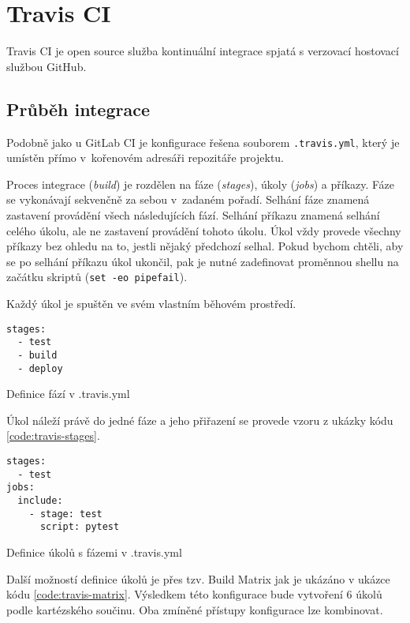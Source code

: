 \chapter{Travis CI}

Travis CI je open source služba kontinuální integrace spjatá s verzovací hostovací službou GitHub.

\section{Průběh integrace}

Podobně jako u GitLab CI je konfigurace řešena souborem \verb|.travis.yml|, který je umístěn přímo v~kořenovém adresáři repozitáře projektu.

Proces integrace (\textit{build}) je rozdělen na fáze (\textit{stages}), úkoly (\textit{jobs}) a příkazy.
Fáze se vykonávají sekvenčně za sebou v~zadaném pořadí.
Selhání fáze znamená zastavení provádění všech následujících fází.
Selhání příkazu znamená selhání celého úkolu, ale ne zastavení provádění tohoto úkolu.
Úkol vždy provede všechny příkazy bez ohledu na to, jestli nějaký předchozí selhal. 
Pokud bychom chtěli, aby se po selhání příkazu úkol ukončil, pak je nutné zadefinovat proměnnou shellu na začátku skriptů (\verb|set -eo pipefail|).

Každý úkol je spuštěn ve svém vlastním běhovém prostředí.

\begin{listing}[ht]
\begin{verbatim}
stages:
  - test
  - build
  - deploy
\end{verbatim}
\caption{Definice fází v .travis.yml}
\end{listing}

Úkol náleží právě do jedné fáze a jeho přiřazení se provede vzoru z ukázky kódu \ref{code:travis-stages}.

\begin{listing}[ht]
\begin{verbatim}
stages:
  - test
jobs:
  include:
    - stage: test
      script: pytest

\end{verbatim}
\label{code:travis-stages}
\caption{Definice úkolů s fázemi v .travis.yml}
\end{listing}

Další možností definice úkolů je přes tzv. Build Matrix jak je ukázáno v ukázce kódu \ref{code:travis-matrix}.
Výsledkem této konfigurace bude vytvoření 6 úkolů podle kartézského součinu.
Oba zmíněné přístupy konfigurace lze kombinovat.

